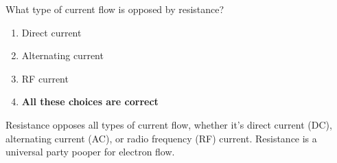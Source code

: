 \begin{tcolorbox}[colback=gray!10!white,colframe=black!75!black,title={T5A11}]
    What type of current flow is opposed by resistance?
    \begin{enumerate}[label=\Alph*),noitemsep]
        \item Direct current
        \item Alternating current
        \item RF current
        \item \textbf{All these choices are correct}
    \end{enumerate}
\end{tcolorbox}
Resistance opposes all types of current flow, whether it's direct current (DC), alternating current (AC), or radio frequency (RF) current. Resistance is a universal party pooper for electron flow.
